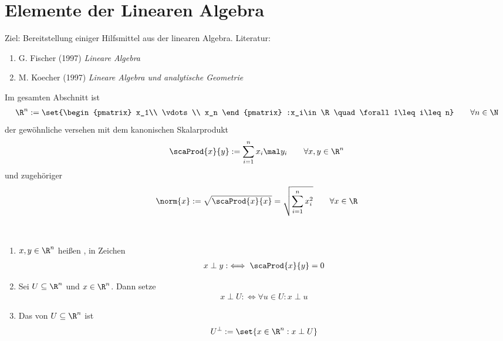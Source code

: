 
\section{Elemente der Linearen Algebra}
Ziel: Bereitstellung einiger Hilfsmittel aus der linearen Algebra.
Literatur:
\begin{enumerate}[label=(\arabic*)]
	\item G. Fischer (1997) \emph{Lineare Algebra} \cite{fischerLinAlg}
	\item M. Koecher (1997) \emph{Lineare Algebra und analytische Geometrie} \cite{koecher2013lineare}
\end{enumerate}

Im gesamten Abschnitt ist
\begin{align*}
	\R^n:=\set{\begin{pmatrix}
		x_1\\
		\vdots\\
		x_n
	\end{pmatrix}
	:x_i\in\R\quad\forall 1\leq i\leq n}\qquad\forall n\in\N
\end{align*}
der gewöhnliche  versehen mit dem kanonischen Skalarprodukt
\begin{align*}
	\scaProd{x}{y}:=\sum\limits_{i=1}^n x_i\mal y_i\qquad\forall x,y\in\R^n
\end{align*}
und zugehöriger 
\begin{align*}
	\norm{x}:=\sqrt{\scaProd{x}{x}}
	=\sqrt{\sum\limits_{i=1}^n x_i^2}
	\qquad\forall x\in\R
\end{align*}

\begin{definition}\label{def2.1}\
	\begin{enumerate}[label=(\arabic*)]
		\item $x,y\in\R^n$ heißen , in Zeichen
		\begin{align*}
			x\perp y:\iff\scaProd{x}{y}=0
		\end{align*}
		\item Sei $U\subseteq\R^n$ und $x\in\R^n$. Dann setze
		\begin{align*}
			x\perp U:\iff\forall u\in U: x\perp u
		\end{align*}
		\item Das  von $U\subseteq\R^n$ ist
		\begin{align*}
			U^\perp:=\set{x\in\R^n:x\perp U}
		\end{align*}
	\end{enumerate}
\end{definition}

